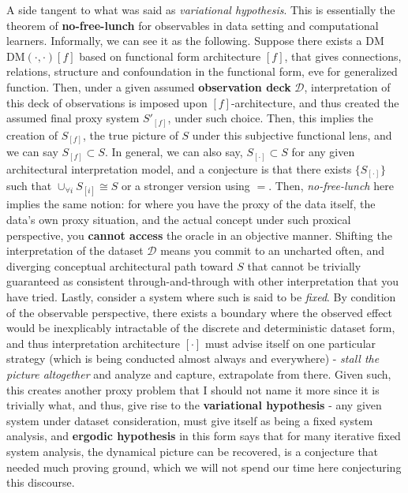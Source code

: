 \documentclass[9pt,a4paper]{article}
\begin{document}
A side tangent to what was said as \textit{variational hypothesis}. This is essentially the theorem of \textbf{no-free-lunch} for observables in data setting and computational learners. Informally, we can see it as the following. Suppose there exists a DM $\mathrm{DM}(\cdot,\cdot)[f]$ based on functional form architecture $[f]$, that gives connections, relations, structure and confoundation in the functional form, eve for generalized function. Then, under a given assumed \textbf{observation deck} $\mathcal{D}$, interpretation of this deck of observations is imposed upon $[f]$-architecture, and thus created the assumed final proxy system $S'_{[f]}$, under such choice. Then, this implies the creation of $S_{[f]}$, the true picture of $S$ under this subjective functional lens, and we can say $S_{[f]}\subset S$. In general, we can also say, $S_{[\cdot]}\subset S$ for any given architectural interpretation model, and a conjecture is that there exists $\{S_{[\cdot]}\}$ such that $\cup_{\forall i}S_{[i]}\cong S$ or a stronger version using $=$. Then, \textit{no-free-lunch} here implies the same notion: for where you have the proxy of the data itself, the data's own proxy situation, and the actual concept under such proxical perspective, you \textbf{cannot access} the oracle in an objective manner. Shifting the interpretation of the dataset $\mathcal{D}$ means you commit to an uncharted often, and diverging conceptual architectural path toward $S$ that cannot be trivially guaranteed as consistent through-and-through with other interpretation that you have tried. Lastly, consider a system where such is said to be \textit{fixed}. By condition of the observable perspective, there exists a boundary where the observed effect would be inexplicably intractable of the discrete and deterministic dataset form, and thus interpretation architecture $[\cdot]$ must advise itself on one particular strategy (which is being conducted almost always and everywhere) - \textit{stall the picture altogether} and analyze and capture, extrapolate from there. Given such, this creates another proxy problem that I should not name it more since it is trivially what, and thus, give rise to the \textbf{variational hypothesis} - any given system under dataset consideration, must give itself as being a fixed system analysis, and \textbf{ergodic hypothesis} in this form says that for many iterative fixed system analysis, the dynamical picture can be recovered, is a conjecture that needed much proving ground, which we will not spend our time here conjecturing this discourse. 
\end{document}
